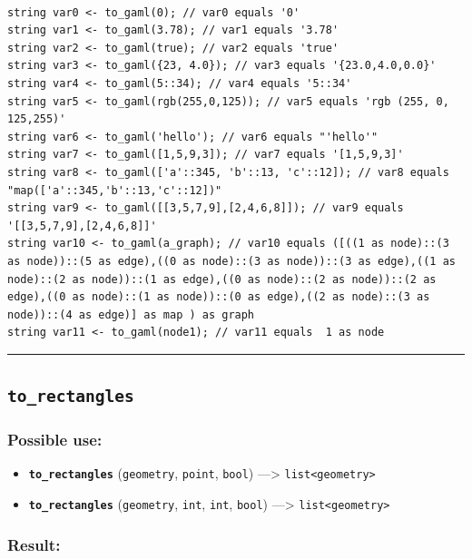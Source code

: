 \documentclass[]{book}
\providecommand{\tightlist}{%
  \setlength{\itemsep}{0pt}\setlength{\parskip}{0pt}}
\theoremstyle{definition}
\theoremstyle{definition}
\theoremstyle{definition}
\theoremstyle{remark}
\begin{document}
\begin{verbatim}
 
string var0 <- to_gaml(0); // var0 equals '0' 
string var1 <- to_gaml(3.78); // var1 equals '3.78' 
string var2 <- to_gaml(true); // var2 equals 'true' 
string var3 <- to_gaml({23, 4.0}); // var3 equals '{23.0,4.0,0.0}' 
string var4 <- to_gaml(5::34); // var4 equals '5::34' 
string var5 <- to_gaml(rgb(255,0,125)); // var5 equals 'rgb (255, 0, 125,255)' 
string var6 <- to_gaml('hello'); // var6 equals "'hello'" 
string var7 <- to_gaml([1,5,9,3]); // var7 equals '[1,5,9,3]' 
string var8 <- to_gaml(['a'::345, 'b'::13, 'c'::12]); // var8 equals "map(['a'::345,'b'::13,'c'::12])" 
string var9 <- to_gaml([[3,5,7,9],[2,4,6,8]]); // var9 equals '[[3,5,7,9],[2,4,6,8]]' 
string var10 <- to_gaml(a_graph); // var10 equals ([((1 as node)::(3 as node))::(5 as edge),((0 as node)::(3 as node))::(3 as edge),((1 as node)::(2 as node))::(1 as edge),((0 as node)::(2 as node))::(2 as edge),((0 as node)::(1 as node))::(0 as edge),((2 as node)::(3 as node))::(4 as edge)] as map ) as graph 
string var11 <- to_gaml(node1); // var11 equals  1 as node
\end{verbatim}

\begin{center}\rule{0.5\linewidth}{\linethickness}\end{center}

\subsection{\texorpdfstring{\texttt{to\_rectangles}}{to\_rectangles}}\label{to_rectangles}

\subsubsection{Possible use:}\label{possible-use-522}

\begin{itemize}
\tightlist
\item
  \textbf{\texttt{to\_rectangles}} (\texttt{geometry}, \texttt{point},
  \texttt{bool}) ---\textgreater{}
  \texttt{list\textless{}geometry\textgreater{}}
\item
  \textbf{\texttt{to\_rectangles}} (\texttt{geometry}, \texttt{int},
  \texttt{int}, \texttt{bool}) ---\textgreater{}
  \texttt{list\textless{}geometry\textgreater{}}
\end{itemize}

\subsubsection{Result:}\label{result-504}
\end{document}
